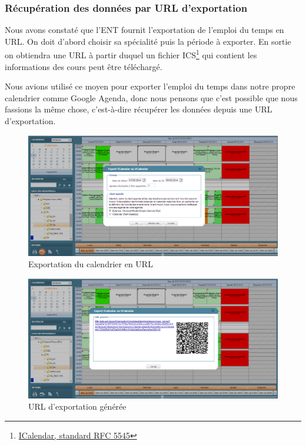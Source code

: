 \documentclass[twoside]{EPURapport}
\begin{document}
\subsubsection{Récupération des données par URL d'exportation}%
Nous avons constaté que l'ENT fournit l'exportation de l'emploi du temps en URL. On doit d'abord choisir sa spécialité puis la période à exporter. En sortie on obtiendra une URL à partir duquel un fichier ICS\footnote{\href{http://fr.wikipedia.org/wiki/ICalendar}{ICalendar, standard RFC 5545}} qui contient les informations des cours peut être téléchargé.


Nous avions utilisé ce moyen pour exporter l'emploi du temps dans notre propre calendrier comme Google Agenda, donc nous pensons que c'est possible que nous fassions la même chose, c'est-à-dire récupérer les données depuis une URL d'exportation.

\begin{figure}[!htbp]
	\centering
		\includegraphics[scale=0.4]{img/export.png}
	\caption{Exportation du calendrier en URL}
	\label{fig:export}
\end{figure}
\bigskip

\begin{figure}[!htbp]
	\centering
		\includegraphics[scale=0.4]{img/url.png}
	\caption{URL d'exportation générée}
	\label{fig:url}
\end{figure}
\bigskip
\end{document}
